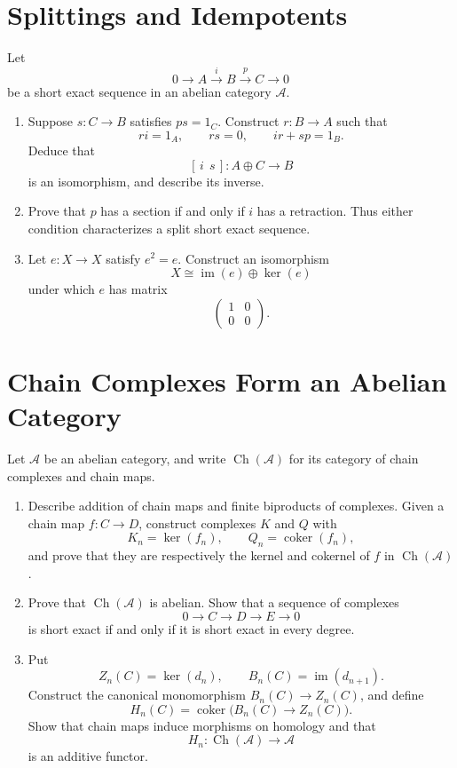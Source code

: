 \documentclass[11pt]{article}
\DeclareMathOperator{\im}{im}
\DeclareMathOperator{\coker}{coker}
\DeclareMathOperator{\Ch}{Ch}
\begin{document}
\section{Splittings and Idempotents}
Let
\[
0\longrightarrow A\xrightarrow{i}B\xrightarrow{p}C\longrightarrow0
\]
be a short exact sequence in an abelian category \(\mathcal A\).
\begin{enumerate}
\item Suppose \(s:C\to B\) satisfies \(ps=1_C\). Construct \(r:B\to A\)
such that
\[
ri=1_A,\qquad rs=0,\qquad ir+sp=1_B.
\]
Deduce that
\[
[\,i\ \ s\,]:A\oplus C\longrightarrow B
\]
is an isomorphism, and describe its inverse.

\item Prove that \(p\) has a section if and only if \(i\) has a retraction.
Thus either condition characterizes a split short exact sequence.

\item Let \(e:X\to X\) satisfy \(e^2=e\). Construct an isomorphism
\[
X\cong\im(e)\oplus\ker(e)
\]
under which \(e\) has matrix
\[
\begin{pmatrix}1&0\\0&0\end{pmatrix}.
\]
\end{enumerate}

\section{Chain Complexes Form an Abelian Category}
Let \(\mathcal A\) be an abelian category, and write
\(\Ch(\mathcal A)\) for its category of chain complexes and chain maps.
\begin{enumerate}
\item Describe addition of chain maps and finite biproducts of complexes.
Given a chain map \(f:C\to D\), construct complexes \(K\) and \(Q\) with
\[
K_n=\ker(f_n),\qquad Q_n=\coker(f_n),
\]
and prove that they are respectively the kernel and cokernel of \(f\) in
\(\Ch(\mathcal A)\).

\item Prove that \(\Ch(\mathcal A)\) is abelian. Show that a sequence
of complexes
\[
0\longrightarrow C\longrightarrow D\longrightarrow E\longrightarrow0
\]
is short exact if and only if it is short exact in every degree.

\item Put
\[
Z_n(C)=\ker(d_n),\qquad B_n(C)=\im(d_{n+1}).
\]
Construct the canonical monomorphism \(B_n(C)\to Z_n(C)\), and define
\[
H_n(C)=\coker\bigl(B_n(C)\longrightarrow Z_n(C)\bigr).
\]
Show that chain maps induce morphisms on homology and that
\[
H_n:\Ch(\mathcal A)\longrightarrow\mathcal A
\]
is an additive functor.
\end{enumerate}
\end{document}
